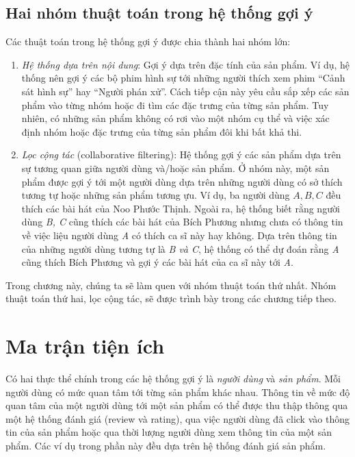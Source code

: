 \subsection{Hai nhóm thuật toán trong hệ thống gợi ý}
Các thuật toán trong hệ thống gợi ý được chia thành hai nhóm lớn: 
\begin{enumerate}
    \item \textit{Hệ thống dựa trên nội dung}: Gợi ý dựa trên đặc tính của sản
    phẩm. Ví dụ, hệ thống nên gợi ý các bộ phim hình sự tới những người thích xem phim ``Cảnh sát hình sự'' hay ``Người phán xử''. Cách tiếp cận này
    yêu cầu sắp xếp các sản phẩm vào từng nhóm hoặc đi tìm các đặc
    trưng của từng sản phẩm. Tuy nhiên, có những sản phẩm không có
    rơi vào một nhóm cụ thể và việc xác định nhóm hoặc đặc trưng của từng sản phẩm đôi khi bất khả thi.
     
     
    \item \textit{Lọc cộng tác} (collaborative filtering): Hệ thống gợi ý các
    sản phẩm dựa trên sự tương quan giữa người dùng và/hoặc sản phẩm. Ở nhóm
    này, một sản phẩm được {gợi ý} tới một người dùng dựa trên những người dùng
    có sở thích tương tự hoặc những sản phẩm tương ựu. Ví dụ, ba người dùng ${A,
    B, C}$ đều thích các bài hát của Noo Phước Thịnh. Ngoài ra, hệ thống biết
    rằng người dùng \textit{B, C} cũng thích các bài hát của Bích Phương nhưng
    chưa có thông tin về việc liệu người dùng \textit{A} có thích ca sĩ này hay
    không. Dựa trên thông tin của những người dùng tương tự là \textit{B và C},
    hệ thống có thể dự đoán rằng \textit{A} cũng thích Bích Phương và gợi ý các
    bài hát của ca sĩ này tới \textit{A}.
 
\end{enumerate}
Trong chương này, chúng ta sẽ làm quen với nhóm thuật toán thứ nhất. Nhóm thuật toán thứ hai, lọc cộng tác, sẽ được trình bày trong
các chương tiếp theo.

\section{Ma trận tiện ích}
Có hai thực thể chính trong các hệ thống gợi ý là
\textit{người dùng} và \textit{sản phẩm}. Mỗi người dùng có mức quan tâm tới từng sản phẩm khác nhau. Thông tin về mức độ quan tâm của một người dùng tới một
sản phẩm có thể được thu thập thông qua một hệ thống đánh
giá ({review} và {rating}), qua việc người dùng đã click vào thông tin
của sản phẩm hoặc qua thời lượng người dùng xem thông tin của một sản phẩm. Các ví dụ trong phần này đều dựa trên hệ thống đánh giá sản phẩm.

